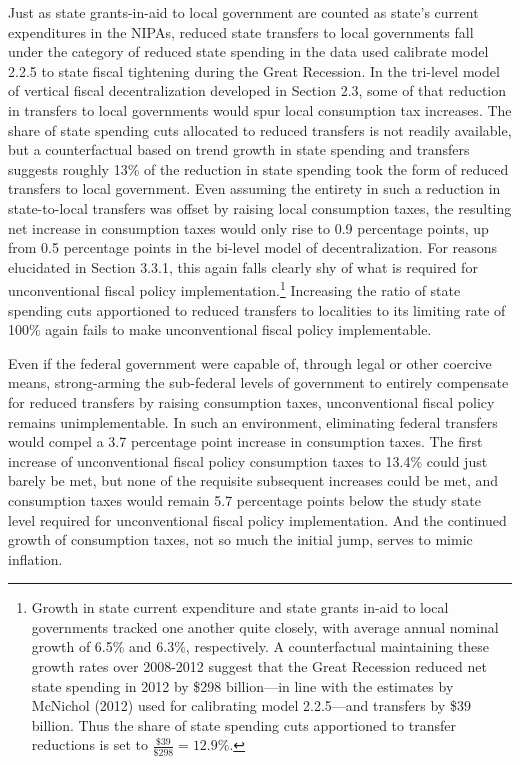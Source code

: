 \documentclass[12pt,letterpaper]{article}
\begin{document}
Just as state grants-in-aid to local government are counted as state's current expenditures in the NIPAs, reduced state transfers to local governments fall under the category of reduced state spending in the data used calibrate model 2.2.5 to state fiscal tightening during the Great Recession. In the tri-level model of vertical fiscal decentralization developed in Section 2.3, some of that reduction in transfers to local governments would spur local consumption tax increases. The share of state spending cuts allocated to reduced transfers is not readily available, but a counterfactual based on trend growth in state spending and transfers suggests roughly 13\% of the reduction in state spending took the form of reduced transfers to local government. Even assuming the entirety in such a reduction in state-to-local transfers was offset by raising local consumption taxes, the resulting net increase in consumption taxes would only rise to 0.9 percentage points, up from 0.5 percentage points in the bi-level model of decentralization. For reasons elucidated in Section 3.3.1, this again falls clearly shy of what is required for unconventional fiscal policy implementation.\footnote{Growth in state current expenditure and state grants in-aid to local governments tracked one another quite closely, with average annual nominal growth of 6.5\% and 6.3\%, respectively. A counterfactual maintaining these growth rates over 2008-2012 suggest that the Great Recession reduced net state spending in 2012 by \$298 billion---in line with the estimates by McNichol (2012) used for calibrating model 2.2.5---and transfers by \$39 billion. Thus the share of state spending cuts apportioned to transfer reductions is set to $\frac{\$39}{\$298} = 12.9\%$.}  Increasing the ratio of state spending cuts apportioned to reduced transfers to localities to its limiting rate of 100\% again fails to make unconventional fiscal policy implementable. 

Even if the federal government were capable of, through legal or other coercive means, strong-arming the sub-federal levels of government to entirely compensate for reduced transfers by raising consumption taxes, unconventional fiscal policy remains unimplementable. In such an environment, eliminating federal transfers would compel a 3.7 percentage point increase in consumption taxes. The first increase of unconventional fiscal policy consumption taxes to 13.4\% could just barely be met, but none of the requisite subsequent increases could be met, and consumption taxes would remain 5.7 percentage points below the study state level required for unconventional fiscal policy implementation. And the continued growth of consumption taxes, not so much the initial jump, serves to mimic inflation.
\end{document}
